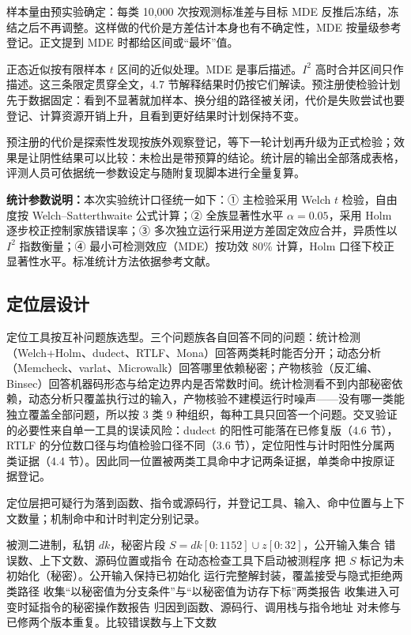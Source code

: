 样本量由预实验确定：每类 10,000 次按观测标准差与目标 MDE 反推后冻结，冻结之后不再调整。这样做的代价是方差估计本身也有不确定性，MDE 按量级参考登记。正文提到 MDE 时都给区间或“最坏”值。

正态近似按有限样本 $t$ 区间的近似处理。MDE 是事后描述。$I^2$ 高时合并区间只作描述。这三条限定贯穿全文，4.7 节解释结果时仍按它们解读。预注册使检验计划先于数据固定：看到不显著就加样本、换分组的路径被关闭，代价是失败尝试也要登记、计算资源开销上升，且看到更好结果时计划保持不变。

预注册的代价是探索性发现按族外观察登记，等下一轮计划再升级为正式检验；效果是让阴性结果可以比较：未检出是带预算的结论。统计层的输出全部落成表格，评测人员可依据统一参数设定与随附复现脚本进行全量复算。

\textbf{统计参数说明：}本次实验统计口径统一如下：① 主检验采用 Welch $t$ 检验，自由度按 Welch--Satterthwaite 公式计算；② 全族显著性水平 $\alpha=0.05$，采用 Holm 逐步校正控制家族错误率；③ 多次独立运行采用逆方差固定效应合并，异质性以 $I^2$ 指数衡量；④ 最小可检测效应（MDE）按功效 80\% 计算，Holm 口径下校正显著性水平。标准统计方法依据参考文献\cite{dudect,rtlf}。

\subsection{定位层设计}

定位工具按互补问题族选型。三个问题族各自回答不同的问题：统计检测（Welch+Holm、dudect、RTLF、Mona）回答两类耗时能否分开；动态分析（Memcheck、varlat、Microwalk）回答哪里依赖秘密；产物核验（反汇编、Binsec）回答机器码形态与给定边界内是否常数时间。统计检测看不到内部秘密依赖，动态分析只覆盖执行过的输入，产物核验不建模运行时噪声——没有哪一类能独立覆盖全部问题，所以按 3 类 9 种组织，每种工具只回答一个问题。交叉验证的必要性来自单一工具的误读风险：dudect 的阳性可能落在已修复版（4.6 节），RTLF 的分位数口径与均值检验口径不同（3.6 节），定位阳性与计时阳性分属两类证据（4.4 节）。因此同一位置被两类工具命中才记两条证据，单类命中按原证据登记。

定位层把可疑行为落到函数、指令或源码行，并登记工具、输入、命中位置与上下文数量；机制命中和计时判定分别记录。

\begin{algorithm}[H]
\caption{秘密标记动态检查}
\label{alg:memcheck}
\begin{algorithmic}[1]
\Require 被测二进制，私钥 $dk$，秘密片段 $S=dk[0{:}1152]\cup z[0{:}32]$，公开输入集合
\Ensure 错误数、上下文数、源码位置或指令
\State 在动态检查工具下启动被测程序
\State 把 $S$ 标记为未初始化（秘密）。公开输入保持已初始化
\State 运行完整解封装，覆盖接受与隐式拒绝两类路径
\State 收集“以秘密值为分支条件”与“以秘密值为访存下标”两类报告
\State 收集进入可变时延指令的秘密操作数报告
\State 归因到函数、源码行、调用栈与指令地址
\State 对未修与已修两个版本重复。比较错误数与上下文数
\end{algorithmic}
\end{algorithm}

